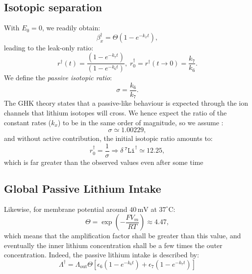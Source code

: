 \documentclass[aps,onecolumn,11pt]{revtex4}
\newcommand{\mychem}[1]{\mathtt{#1}}
\newcommand{\spLi}[1]{{~^{\mychem{#1}}\mychem{Li}}}
\newcommand{\deltaLi}{ {\delta\!\!\!\spLi{7}} }
\newcommand{\LiAll}{\Lambda}
\newcommand{\LiAllOut}{{\LiAll}_{\mathrm{out}}}
\newcommand{\todo}[1]{\framebox{\textbf{\color{WildStrawberry}{#1}}}}
\newcommand{\ko}{\dagger}
\begin{document}
\subsection{Isotopic separation}
With $E_0=0$, we readily obtain:
\begin{equation}
	\beta^\ko_x = \Theta \left(1-e^{-k_xt} \right),
\end{equation}
leading to the leak-only ratio:
\begin{equation}
	r^\ko(t) =  \dfrac{\left(1-e^{-k_7t} \right)}{\left(1-e^{-k_6t} \right)},\;r^\ko_0 = r^\ko(t\to0) = \dfrac{k_7}{k_6}.
\end{equation}
We define the \textit{passive isotopic ratio}:
\begin{equation}
\label{eq:sigma}
	\sigma  =  \dfrac{k_6}{k_7}.
\end{equation}
The GHK theory states that a passive-like behaviour is expected through the ion channels that lithium isotopes will cross.
We hence expect the ratio of the constant rates ($k_x$) to be in the same order of magnitude, so we assume \todo{ref}:
\begin{equation}
	\sigma \simeq 1.00229,
\end{equation}
and without active contribution, the initial isotopic ratio amounts to:
\begin{equation}
	r_0^\ko = \dfrac{1}{\sigma} \Rightarrow \deltaLi^\ko \simeq  12.25,
\end{equation}
which is far greater than the observed values even after some time \todo{ref figures in manuscript+values}


\subsection{Global Passive Lithium Intake}
Likewise, for membrane potential around $40\,\text{mV}$ at $37^\circ\text{C}$:
\begin{equation}
\label{eq:ThetaValue}
	\Theta = \exp\left( -\dfrac{FV_m}{RT}\right) \approx 4.47,
\end{equation}
which means that the amplification factor shall be greater than this value, and eventually the inner lithium concentration shall
be a few times the outer concentration. Indeed, the passive lithium intake is described by:
\begin{equation}
\label{eq:LiAllKO}
	\LiAll^\ko = \LiAllOut \Theta \left[ \epsilon_6 \left(1-e^{-k_6t}\right)  + \epsilon_7 \left(1-e^{-k_7t}\right)\right]
\end{equation}
\end{document}
